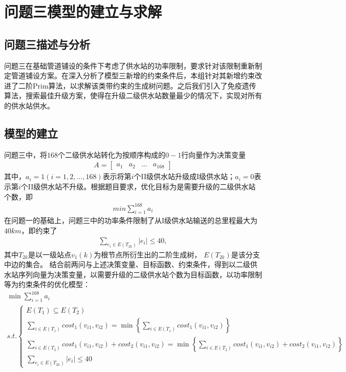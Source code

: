 \documentclass{whutmod}
\begin{document}
    \section{问题三模型的建立与求解}
   		\subsection{问题三描述与分析}
   		问题三在基础管道铺设的条件下考虑了供水站的功率限制，要求针对该限制重新制定管道铺设方案。在深入分析了模型三新增的约束条件后，本组针对其新增约束改进了二阶Prim算法，以求解该类带约束的生成树问题。之后我们引入了免疫遗传算法，搜索最佳升级方案，使得在升级二级供水站数量最少的情况下，实现对所有的供水站供水。
    	\subsection{模型的建立}
    	问题三中，将$168$个二级供水站转化为按顺序构成的$0-1$行向量作为决策变量
    	\begin{gather}
    	A=
    	\begin{bmatrix}
    	a_1&a_2&...&a_{168}
    	\end{bmatrix}
    	\end{gather}
    	其中，$a_i=1(i=1,2,...,168)$表示将第$i$个II级供水站升级成I级供水站；$a_i=0$表示第$i$个II级供水站不升级。根据题目要求，优化目标为是需要升级的二级供水站个数，即
    	\begin{gather}
    	min\sum_{i=1}^{168}a_i
    	\end{gather}
    	在问题一的基础上，问题三中的功率条件限制了从I级供水站输送的总里程最大为$40km$，即约束了
    	\begin{gather}
    	\sum_{e_i\in E(T_{2k})}|e_i|\leq 40,
    	\end{gather}
    	其中$T_{2k}$是以一级站点$v_1(k)$为根节点所衍生出的二阶生成树， $E(T_{2k})$是该分支中边的集合。 结合前两问与上述决策变量、目标函数、约束条件，得到以二级供水站序列向量为决策变量，以需要升级的二级供水站个数为目标函数，以功率限制等为约束条件的优化模型：
    	\begin{gather}
    	\min \sum_{i=1}^{168}a_i\\
    	s.t.
    	\left\{\begin{matrix}
    	E(T_{1})\subseteq  E(T_{2})\\ 
    	\sum_{i\in E(T_1) }cost_1(v_{i1},v_{i2})=\min\left \{ 	\sum_{i\in E(T_1) }cost_1(v_{i1},v_{i2}) \right \} \\ 
    	\sum_{i\in E(T_2) }cost_1(v_{i1},v_{i2})+cost_2(v_{i1},v_{i2}) =\min \left\{ \sum_{i\in E(T_2) }cost_1(v_{i1},v_{i2})+cost_2(v_{i1},v_{i2}) \right \}	\\
    	\sum_{e_i\in E(T_{2k})}|e_i|\leq 40
    	\end{matrix}\right.
    	\end{gather}
\end{document}

